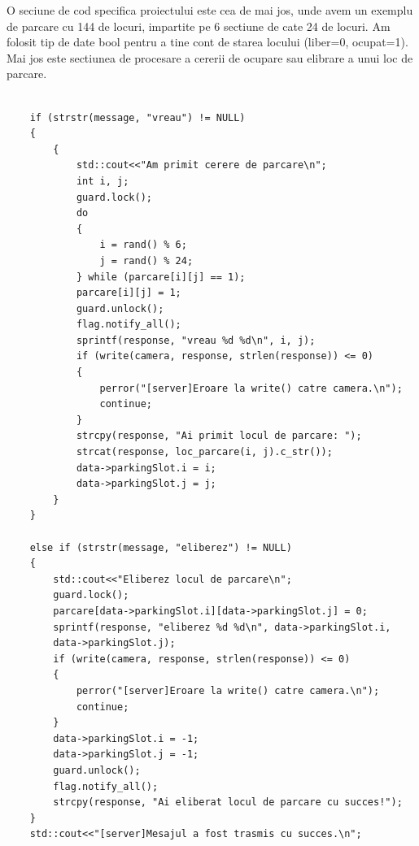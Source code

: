 \documentclass[runningheads]{llncs}
\begin{document}
O seciune de cod specifica proiectului este cea de mai jos, unde avem un exemplu de parcare cu 144 de locuri, impartite pe 6 sectiune de cate 24 de locuri. Am folosit tip de date bool pentru a tine cont de starea locului (liber=0, ocupat=1). Mai jos este sectiunea de procesare a cererii de ocupare sau elibrare a unui loc de parcare.
\begin{tcolorbox}[colback=red!5,colframe=red!50!black,width = \linewidth, title = Cerere ocupare/eliberare loc de parcare]
    \begin{verbatim}

    if (strstr(message, "vreau") != NULL)
    {
        {
            std::cout<<"Am primit cerere de parcare\n";
            int i, j;
            guard.lock();
            do
            {
                i = rand() % 6;
                j = rand() % 24;
            } while (parcare[i][j] == 1);
            parcare[i][j] = 1;
            guard.unlock();
            flag.notify_all();
            sprintf(response, "vreau %d %d\n", i, j);
            if (write(camera, response, strlen(response)) <= 0)
            {
                perror("[server]Eroare la write() catre camera.\n");
                continue;
            }
            strcpy(response, "Ai primit locul de parcare: ");
            strcat(response, loc_parcare(i, j).c_str());
            data->parkingSlot.i = i;
            data->parkingSlot.j = j;
        }
    }
    
    else if (strstr(message, "eliberez") != NULL)
    {
        std::cout<<"Eliberez locul de parcare\n";
        guard.lock();
        parcare[data->parkingSlot.i][data->parkingSlot.j] = 0;
        sprintf(response, "eliberez %d %d\n", data->parkingSlot.i,
        data->parkingSlot.j);
        if (write(camera, response, strlen(response)) <= 0)
        {
            perror("[server]Eroare la write() catre camera.\n");
            continue;
        }
        data->parkingSlot.i = -1;
        data->parkingSlot.j = -1;
        guard.unlock();
        flag.notify_all();
        strcpy(response, "Ai eliberat locul de parcare cu succes!");
    }
    std::cout<<"[server]Mesajul a fost trasmis cu succes.\n";
\end{verbatim}
\end{tcolorbox} 
\end{document}
